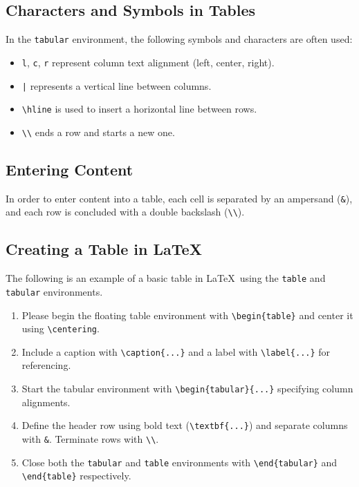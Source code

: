 \documentclass[12pt,journal,compsoc]{IEEEtran}
\begin{document}
\subsection{Characters and Symbols in Tables}
In the \texttt{tabular} environment, the following symbols and characters are often used:
\begin{itemize}
    \item \texttt{l}, \texttt{c}, \texttt{r} represent column text alignment (left, center, right).
    \item \texttt{|} represents a vertical line between columns.
    \item \texttt{\textbackslash hline} is used to insert a horizontal line between rows.
    \item \texttt{\textbackslash\textbackslash} ends a row and starts a new one.
\end{itemize}

\subsection{Entering Content}
In order to enter content into a table, each cell is separated by an ampersand (\texttt{\&}), and each row is concluded with a double backslash (\texttt{\textbackslash\textbackslash}). 

\subsection{Creating a Table in \LaTeX}
The following is an example of a basic table in \LaTeX\, using the \texttt{table} and \texttt{tabular} environments.

\begin{enumerate}
    \item Please begin the floating table environment with \texttt{\textbackslash begin\{table\}} and center it using \texttt{\textbackslash centering}.
    \item Include a caption with \texttt{\textbackslash caption\{...\}} and a label with \texttt{\textbackslash label\{...\}} for referencing.
    \item Start the tabular environment with \texttt{\textbackslash begin\{tabular\}\{...\}} specifying column alignments.  
    \item Define the header row using bold text (\texttt{\textbackslash textbf\{...\}}) and separate columns with \texttt{\&}. Terminate rows with \texttt{\textbackslash\textbackslash}.
    \item Close both the \texttt{tabular} and \texttt{table} environments with \texttt{\textbackslash end\{tabular\}} and \texttt{\textbackslash end\{table\}} respectively.
\end{enumerate}
\end{document}
